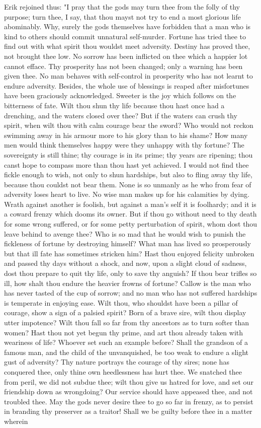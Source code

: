 \documentclass[10pt,a4paper]{report}
\begin{document}
Erik rejoined thus: "I pray that the gods may turn thee from the folly of thy purpose; turn thee, I say, that thou mayst not try to end a most glorious life abominably. Why, surely the gods themselves have forbidden that a man who is kind to others should commit unnatural self-murder. Fortune has tried thee to find out with what spirit thou wouldst meet adversity. Destiny has proved thee, not brought thee low. No sorrow has been inflicted on thee which a happier lot cannot efface. Thy prosperity has not been changed; only a warning has been given thee. No man behaves with self-control in prosperity who has not learnt to endure adversity. Besides, the whole use of blessings is reaped after misfortunes have been graciously acknowledged. Sweeter is the joy which follows on the bitterness of fate. Wilt thou shun thy life because thou hast once had a drenching, and the waters closed over thee? But if the waters can crush thy spirit, when wilt thou with calm courage bear the sword? Who would not reckon swimming away in his armour more to his glory than to his shame? How many men would think themselves happy were they unhappy with thy fortune? The sovereignty is still thine; thy courage is in its prime; thy years are ripening; thou canst hope to compass more than thou hast yet achieved. I would not find thee fickle enough to wish, not only to shun hardships, but also to fling away thy life, because thou couldst not bear them. None is so unmanly as he who from fear of adversity loses heart to live. No wise man makes up for his calamities by dying. Wrath against another is foolish, but against a man's self it is foolhardy; and it is a coward frenzy which dooms its owner. But if thou go without need to thy death for some wrong suffered, or for some petty perturbation of spirit, whom dost thou leave behind to avenge thee? Who is so mad that he would wish to punish the fickleness of fortune by destroying himself? What man has lived so prosperously but that ill fate has sometimes stricken him? Hast thou enjoyed felicity unbroken and passed thy days without a shock, and now, upon a slight cloud of sadness, dost thou prepare to quit thy life, only to save thy anguish? If thou bear trifles so ill, how shalt thou endure the heavier frowns of fortune? Callow is the man who has never tasted of the cup of sorrow; and no man who has not suffered hardships is temperate in enjoying ease. Wilt thou, who shouldst have been a pillar of courage, show a sign of a palsied spirit? Born of a brave sire, wilt thou display utter impotence? Wilt thou fall so far from thy ancestors as to turn softer than women? Hast thou not yet begun thy prime, and art thou already taken with weariness of life? Whoever set such an example before? Shall the grandson of a famous man, and the child of the unvanquished, be too weak to endure a slight gust of adversity? Thy nature portrays the courage of thy sires; none has conquered thee, only thine own heedlessness has hurt thee. We snatched thee from peril, we did not subdue thee; wilt thou give us hatred for love, and set our friendship down as wrongdoing? Our service should have appeased thee, and not troubled thee. May the gods never desire thee to go so far in frenzy, as to persist in branding thy preserver as a traitor! Shall we be guilty before thee in a matter wherein 
\end{document}
